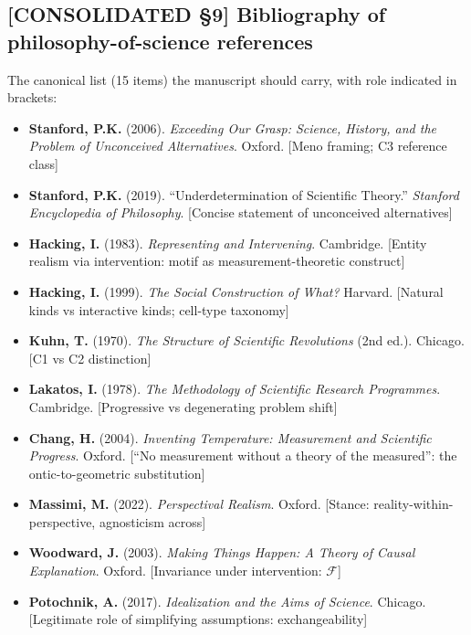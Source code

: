 \subsection*{[CONSOLIDATED §9] Bibliography of philosophy-of-science references}
\label{philo:bibliography}

The canonical list (15 items) the manuscript should carry, with role indicated in brackets:

\begin{itemize}[leftmargin=*]
  \item \textbf{Stanford, P.K.} (2006). \emph{Exceeding Our Grasp: Science, History, and the Problem of Unconceived Alternatives}. Oxford. [Meno framing; C3 reference class]
  \item \textbf{Stanford, P.K.} (2019). ``Underdetermination of Scientific Theory.'' \emph{Stanford Encyclopedia of Philosophy}. [Concise statement of unconceived alternatives]
  \item \textbf{Hacking, I.} (1983). \emph{Representing and Intervening}. Cambridge. [Entity realism via intervention: motif as measurement-theoretic construct]
  \item \textbf{Hacking, I.} (1999). \emph{The Social Construction of What?} Harvard. [Natural kinds vs interactive kinds; cell-type taxonomy]
  \item \textbf{Kuhn, T.} (1970). \emph{The Structure of Scientific Revolutions} (2nd ed.). Chicago. [C1 vs C2 distinction]
  \item \textbf{Lakatos, I.} (1978). \emph{The Methodology of Scientific Research Programmes}. Cambridge. [Progressive vs degenerating problem shift]
  \item \textbf{Chang, H.} (2004). \emph{Inventing Temperature: Measurement and Scientific Progress}. Oxford. [``No measurement without a theory of the measured'': the ontic-to-geometric substitution]
  \item \textbf{Massimi, M.} (2022). \emph{Perspectival Realism}. Oxford. [Stance: reality-within-perspective, agnosticism across]
  \item \textbf{Woodward, J.} (2003). \emph{Making Things Happen: A Theory of Causal Explanation}. Oxford. [Invariance under intervention: $\mathcal{F}$]
  \item \textbf{Potochnik, A.} (2017). \emph{Idealization and the Aims of Science}. Chicago. [Legitimate role of simplifying assumptions: exchangeability]

\end{itemize}
